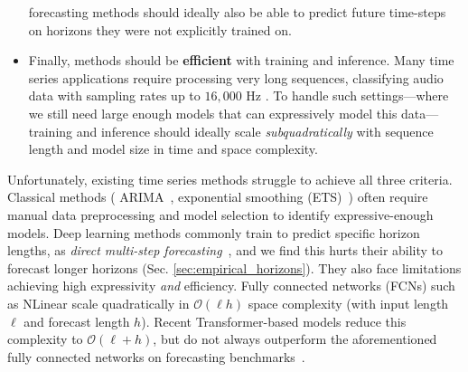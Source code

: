 \begin{itemize}[leftmargin=*]
forecasting methods should ideally
also be able to predict future time-steps on horizons they were not explicitly trained on.
%
\item Finally, methods should be \textbf{efficient} with training and inference. Many time series applications require processing very long sequences, \eg{} classifying audio data with sampling rates up to $16{,}000$ Hz \citep{warden2018speech}. 
To handle such settings---where we still need large enough models that can expressively model this data---training and inference should ideally scale \emph{subquadratically} with sequence length and model size in time and space complexity.
\end{itemize}

Unfortunately, existing time series methods struggle to achieve all three criteria.  
%
Classical methods (\cf{} ARIMA~\citep{box1970time}, exponential smoothing (ETS)~\citep{winters1960forecasting}) often require manual data preprocessing and model selection to identify expressive-enough models. 
%
Deep learning methods commonly train to predict specific horizon lengths, \ie{} as \emph{direct multi-step forecasting}~\citep{https://doi.org/10.1111/j.1467-6419.2007.00518.x}, and we find this hurts their ability to forecast longer horizons (Sec. \ref{sec:empirical_horizons}).  
%
They also face limitations achieving high expressivity \emph{and} efficiency. Fully connected networks (FCNs) such as NLinear \cite{zeng2022transformers} scale quadratically in $\mathcal{O}(\ell h)$ space complexity (with input length $\ell$ and forecast length $h$). 
%
Recent Transformer-based models reduce this complexity to $\mathcal{O}(\ell + h)$, but do not always outperform the aforementioned fully connected networks on forecasting benchmarks~\citep{liu2022pyraformer, zhou2021informer}. 
%

